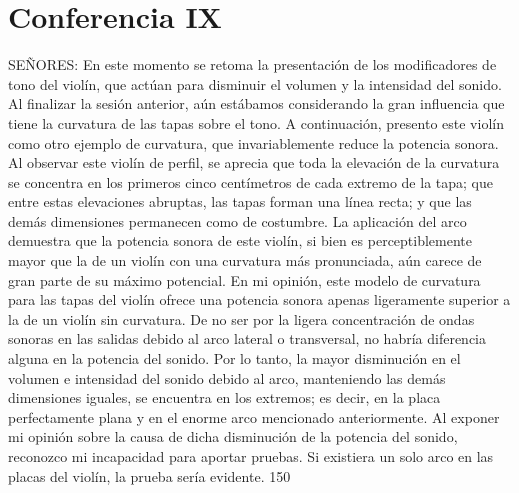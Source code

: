 \chapter*{Conferencia IX}
SEÑORES: En este momento se retoma la presentación de los modificadores de tono del violín, que actúan para disminuir el volumen y la intensidad del sonido. Al finalizar la sesión anterior, aún estábamos considerando la gran influencia que tiene la curvatura de las tapas sobre el tono. A continuación, presento este violín como otro ejemplo de curvatura, que invariablemente reduce la potencia sonora. Al observar este violín de perfil, se aprecia que toda la elevación de la curvatura se concentra en los primeros cinco centímetros de cada extremo de la tapa; que entre estas elevaciones abruptas, las tapas forman una línea recta; y que las demás dimensiones permanecen como de costumbre. La aplicación del arco demuestra que la potencia sonora de este violín, si bien es perceptiblemente mayor que la de un violín con una curvatura más pronunciada, aún carece de gran parte de su máximo potencial. En mi opinión, este modelo de curvatura para las tapas del violín ofrece una potencia sonora apenas ligeramente superior a la de un violín sin curvatura. De no ser por la ligera concentración de ondas sonoras en las salidas debido al arco lateral o transversal, no habría diferencia alguna en la potencia del sonido. Por lo tanto, la mayor disminución en el volumen e intensidad del sonido debido al arco, manteniendo las demás dimensiones iguales, se encuentra en los extremos; es decir, en la placa perfectamente plana y en el enorme arco mencionado anteriormente. Al exponer mi opinión sobre la causa de dicha disminución de la potencia del sonido, reconozco mi incapacidad para aportar pruebas. Si existiera un solo arco en las placas del violín, la prueba sería evidente.
150

